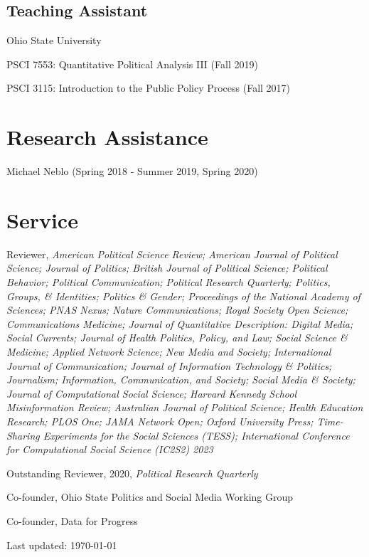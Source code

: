 \documentclass[letterpaper]{article}
\renewenvironment{itemize}{
  \begin{list}{}{
    \setlength{\leftmargin}{1.5em}
  }
}{
  \end{list}
}
\begin{document}
\subsection*{Teaching Assistant}

\begin{itemize}
\item Ohio State University 
\begin{itemize}
\item PSCI 7553: Quantitative Political Analysis III (Fall 2019)
\item PSCI 3115: Introduction to the Public Policy Process (Fall 2017)
\end{itemize}
\end{itemize}

\section*{Research Assistance}
\begin{itemize}
\item  Michael Neblo (Spring 2018 - Summer 2019, Spring 2020)
\end{itemize}

\section*{Service}

\begin{itemize}
\item Reviewer, \textit{American Political Science Review; American Journal of Political Science; Journal of Politics; British Journal of Political Science; Political Behavior; Political Communication; Political Research Quarterly; Politics, Groups, \& Identities; Politics \& Gender; Proceedings of the National Academy of Sciences; PNAS Nexus; Nature Communications; Royal Society Open Science; Communications Medicine; Journal of Quantitative Description: Digital Media; Social Currents; Journal of Health Politics, Policy, and Law; Social Science \& Medicine; Applied Network Science; New Media and Society; International Journal of Communication; Journal of Information Technology \& Politics; Journalism; Information, Communication, and Society; Social Media \& Society; Journal of Computational Social Science; Harvard Kennedy School Misinformation Review; Australian Journal of Political Science; Health Education Research; PLOS One; JAMA Network Open; Oxford University Press; Time-Sharing Experiments for the Social Sciences (TESS); International Conference for Computational Social Science (IC2S2) 2023}
\begin{itemize}
Outstanding Reviewer, 2020, \textit{Political Research Quarterly}
\end{itemize}
\item Co-founder, Ohio State Politics and Social Media Working Group
\item Co-founder, Data for Progress
\end{itemize}

\begin{center}
  \begin{footnotesize}
    Last updated: \today
      \end{footnotesize}
\end{center}
\end{document}
